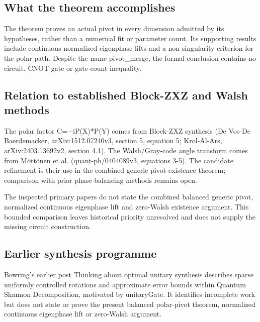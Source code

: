 \documentclass[11pt,a4paper]{article}
\begin{document}
\subsection{What the theorem accomplishes}
The theorem proves an actual pivot in every dimension admitted by its hypotheses, rather than a numerical fit or parameter count. Its supporting results include continuous normalized eigenphase lifts and a non-singularity criterion for the polar path. Despite the name pivot\_merge, the formal conclusion contains no circuit, CNOT gate or gate-count inequality.

\subsection{Relation to established Block-ZXZ and Walsh methods}
The polar factor C=\ensuremath{-}iP(X)*P(Y) comes from Block-ZXZ synthesis (De Vos-De Baerdemacker, arXiv:1512.07240v3, section 5, equation 5; Krol-Al-Ars, arXiv:2403.13692v2, section 4.1). The Walsh/Gray-code angle transform comes from Möttönen et al. (quant-ph/0404089v3, equations 3-5). The candidate refinement is their use in the combined generic pivot-existence theorem; comparison with prior phase-balancing methods remains open.

The inspected primary papers do not state the combined balanced generic pivot, normalized continuous eigenphase lift and zero-Walsh existence argument. This bounded comparison leaves historical priority unresolved and does not supply the missing circuit construction.

\subsection{Earlier synthesis programme}
Bowring's earlier post Thinking about optimal unitary synthesis describes sparse uniformly controlled rotations and approximate error bounds within Quantum Shannon Decomposition, motivated by unitaryGate. It identifies incomplete work but does not state or prove the present balanced polar-pivot theorem, normalized continuous eigenphase lift or zero-Walsh argument.
\end{document}
